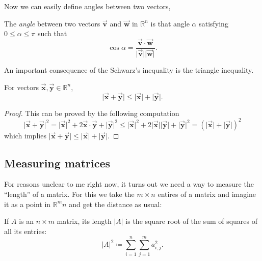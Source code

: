 \documentclass[12pt]{article}
\theoremstyle{remark}
\let\oldvec = \vec
\renewcommand{\vec}[1]{\oldvec{\mathbf{#1}}}
\numberwithin{equation}{section}
\begin{document}
Now we can easily define angles between two vectors, 
\begin{definition}
	The \textit{angle} between two vectors $ \vec{v} $ and $ \vec{w} $ in $ \mathbb{R}^n $ is that angle $ \alpha $ satisfying $ 0 \leq \alpha \leq \pi $ such that 
	\begin{equation}
		\cos{\alpha} = \frac{\vec{v} \cdot \vec{w}}{\lvert \vec{v} \rvert \lvert \vec{w} \rvert}.
	\end{equation}
	
\end{definition}



An important consequence of the Schwarz's inequality is the triangle inequality. 

\begin{important}
	For vectors $ \vec{x}, \vec{y} \in \mathbb{R}^n $, 
	\begin{equation}
	    \lvert \vec{x} + \vec{y} \rvert \leq \lvert \vec{x} \rvert + \lvert \vec{y} \rvert.
	\end{equation}
\end{important}

\begin{proof}
   This can be proved by the following computation
   \begin{equation}
       \lvert \vec{x} + \vec{y} \rvert^2 = \lvert \vec{x} \rvert^2 + 2 \vec{x} \cdot \vec{y} + \lvert \vec{y} \rvert^2 \leq \lvert \vec{x} \rvert^2 + 2 \lvert \vec{x}\rvert \lvert \vec{y} \rvert + \lvert \vec{y} \rvert^2 = (\lvert \vec{x} \rvert + \lvert \vec{y} \rvert)^2 
   \end{equation}
   which implies $ \lvert \vec{x} + \vec{y} \rvert \leq \lvert \vec{x} \rvert + \lvert \vec{y} \rvert. $
\end{proof}

\subsection{Measuring matrices}%
\label{sub:Measuring matrices}

For reasons unclear to me right now, it turns out we need a way to measure the ``length'' of a matrix. For this we take the $ m \times n $ entires of a matrix and imagine it as a point in $ \mathbb{R}^mn $ and get the distance as usual: 


\begin{definition}
    If $ A $ is an $ n \times m $ matrix, its length $ \lvert A \rvert $ is the square root of the sum of squares of all its entries: 
    \begin{equation}
        \lvert A \rvert^{2} \coloneqq \sum^{n}_{i=1} \sum^{m}_{j=1} a^{2}_{i, j}.  
    \end{equation}
\end{definition}
\end{document}
